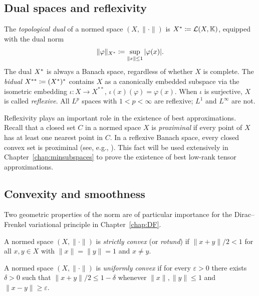 \subsection*{Dual spaces and reflexivity}

The \emph{topological dual} of a normed space $(X, \|\cdot\|)$ is
$X^* \coloneqq \mathcal{L}(X, \mathbb{K})$, equipped with the dual norm
\begin{equation}
\label{eq:dualnorm}
    \|\varphi\|_{X^*} \coloneqq \sup_{\|x\| \leq 1} |\varphi(x)|.
\end{equation}
The dual $X^*$ is always a Banach space, regardless of whether $X$
is complete. The \emph{bidual} $X^{**} \coloneqq (X^*)^*$ contains
$X$ as a canonically embedded subspace via the isometric embedding
$\iota: X \to X^{**}$, $\iota(x)(\varphi) = \varphi(x)$. When $\iota$ is
surjective, $X$ is called \emph{reflexive}. All $L^p$ spaces with
$1 < p < \infty$ are reflexive; $L^1$ and $L^\infty$ are not.

Reflexivity plays an important role in the existence of best approximations.
Recall that a closed set $C$ in a normed space $X$ is \emph{proximinal} if
every point of $X$ has at least one nearest point in $C$. In a reflexive
Banach space, every closed convex set is proximinal
(see, e.g., \cite[p.\,61]{Hackbusch2019}). This fact will be used
extensively in Chapter~\ref{chap:minsubspaces} to prove the existence
of best low-rank tensor approximations.

\subsection*{Convexity and smoothness}

Two geometric properties of the norm are of particular importance for
the Dirac--Frenkel variational principle in Chapter~\ref{chap:DF}.

\begin{definition}
\label{def:strictly_convex}
A normed space $(X, \|\cdot\|)$ is \emph{strictly convex} (or
\emph{rotund}) if $\|x + y\|/2 < 1$ for all $x, y \in X$ with
$\|x\| = \|y\| = 1$ and $x \neq y$.
\end{definition}

\begin{definition}
\label{def:uniformly_convex}
A normed space $(X, \|\cdot\|)$ is \emph{uniformly convex} if for every
$\varepsilon > 0$ there exists $\delta > 0$ such that
$\|x + y\|/2 \leq 1 - \delta$ whenever $\|x\|, \|y\| \leq 1$ and
$\|x - y\| \geq \varepsilon$.
\end{definition}

